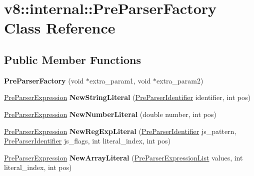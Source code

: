 \hypertarget{classv8_1_1internal_1_1_pre_parser_factory}{}\section{v8\+:\+:internal\+:\+:Pre\+Parser\+Factory Class Reference}
\label{classv8_1_1internal_1_1_pre_parser_factory}
\subsection*{Public Member Functions}
\begin{DoxyCompactItemize}
\item 
\hypertarget{classv8_1_1internal_1_1_pre_parser_factory_a2d80159623e5918f5b9e827f8d2e84b2}{}{\bfseries Pre\+Parser\+Factory} (void $\ast$extra\+\_\+param1, void $\ast$extra\+\_\+param2)\label{classv8_1_1internal_1_1_pre_parser_factory_a2d80159623e5918f5b9e827f8d2e84b2}

\item 
\hypertarget{classv8_1_1internal_1_1_pre_parser_factory_a9486b090ca9c8d6039ed817d181c8ba6}{}\hyperlink{classv8_1_1internal_1_1_pre_parser_expression}{Pre\+Parser\+Expression} {\bfseries New\+String\+Literal} (\hyperlink{classv8_1_1internal_1_1_pre_parser_identifier}{Pre\+Parser\+Identifier} identifier, int pos)\label{classv8_1_1internal_1_1_pre_parser_factory_a9486b090ca9c8d6039ed817d181c8ba6}

\item 
\hypertarget{classv8_1_1internal_1_1_pre_parser_factory_a5549d27a221f2bf8abb9b3a6df4d08e7}{}\hyperlink{classv8_1_1internal_1_1_pre_parser_expression}{Pre\+Parser\+Expression} {\bfseries New\+Number\+Literal} (double number, int pos)\label{classv8_1_1internal_1_1_pre_parser_factory_a5549d27a221f2bf8abb9b3a6df4d08e7}

\item 
\hypertarget{classv8_1_1internal_1_1_pre_parser_factory_af86def21d11bbbcc3bf00927ae2a06ab}{}\hyperlink{classv8_1_1internal_1_1_pre_parser_expression}{Pre\+Parser\+Expression} {\bfseries New\+Reg\+Exp\+Literal} (\hyperlink{classv8_1_1internal_1_1_pre_parser_identifier}{Pre\+Parser\+Identifier} js\+\_\+pattern, \hyperlink{classv8_1_1internal_1_1_pre_parser_identifier}{Pre\+Parser\+Identifier} js\+\_\+flags, int literal\+\_\+index, int pos)\label{classv8_1_1internal_1_1_pre_parser_factory_af86def21d11bbbcc3bf00927ae2a06ab}

\item 
\hypertarget{classv8_1_1internal_1_1_pre_parser_factory_ae2b4613a227c5e5c8dd9a79da4425131}{}\hyperlink{classv8_1_1internal_1_1_pre_parser_expression}{Pre\+Parser\+Expression} {\bfseries New\+Array\+Literal} (\hyperlink{classv8_1_1internal_1_1_pre_parser_expression_list}{Pre\+Parser\+Expression\+List} values, int literal\+\_\+index, int pos)\label{classv8_1_1internal_1_1_pre_parser_factory_ae2b4613a227c5e5c8dd9a79da4425131}


\end{DoxyCompactItemize}
